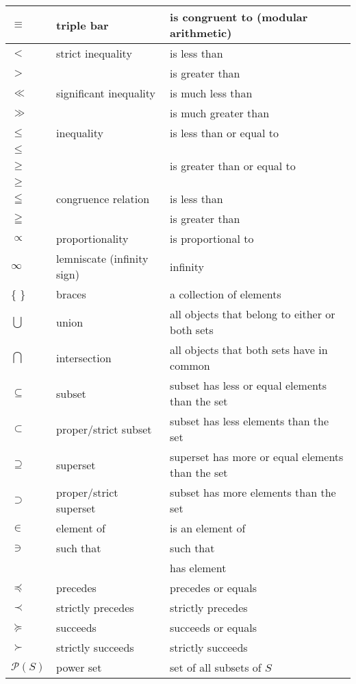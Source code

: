 \documentclass{article}
\begin{document}
\begin{longtable}{|| L{1.7cm} | L{3.5cm} | L{7cm} ||}
\hline
\(\equiv\) & triple bar & is congruent to (modular arithmetic)\\
\hline
\(<\) & strict inequality & is less than\\
\(>\) & & is greater than\\
\hline
\(\ll\) & significant inequality & is much less than\\
\(\gg\) & & is much greater than\\
\hline
\(\le\) & inequality & is less than or equal to\\
\(\leqslant\) & & \\
\(\ge\) & & is greater than or equal to\\
\(\geqslant\) & & \\
\hline
\(\leqq\) & congruence relation & is less than\\
\(\geqq\) & & is greater than\\
\hline
\(\propto\) & proportionality & is proportional to\\
\hline
\(\infty\) & lemniscate (infinity sign) & infinity\\
\hline
{\{} {\}} & braces & a collection of elements\\
\hline
\(\bigcup\) & union & all objects that belong to either or both sets\\
\hline
\(\bigcap\) & intersection & all objects that both sets have in common\\
\hline
\(\subseteq\) & subset & subset has less or equal elements than the set\\
\hline
\(\subset\) & proper/strict subset & subset has less elements than the set\\
\hline
\(\supseteq\) & superset & superset has more or equal elements than the set\\
\hline
\(\supset\) & proper/strict superset & subset has more elements than the set\\
\hline
\(\in\) & element of & is an element of\\
\hline
\(\ni\) & such that & such that\\
& & has element\\
\hline
\(\preceq\) & precedes & precedes or equals\\
\hline
\(\prec\) & strictly precedes & strictly precedes\\
\hline
\(\succeq\) & succeeds & succeeds or equals\\
\hline
\(\succ\) & strictly succeeds & strictly succeeds\\
\hline
\(\mathcal{P} \left({S}\right)\) & power set & set of all subsets of \(S\)\\

\end{longtable}
\end{document}
